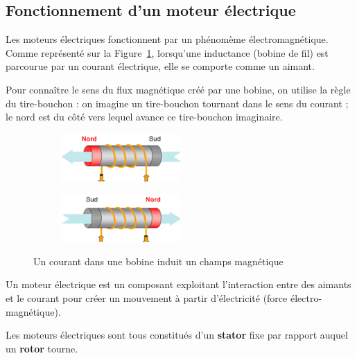 \documentclass[10pt,fleqn]{article} %
\begin{document}
\subsection{Fonctionnement d'un moteur électrique}
Les moteurs électriques fonctionnent par un phénomème électromagnétique. Comme représenté sur la Figure~\ref{fig:induction}, lorsqu'une inductance (bobine de fil) est parcourue par un courant électrique, elle se comporte comme un aimant.

\begin{remark}
    Pour connaître le sens du flux magnétique créé par une bobine, on utilise la règle du tire-bouchon : on imagine un tire-bouchon tournant dans le sens du courant ; le nord est du côté vers lequel avance ce tire-bouchon imaginaire.
\end{remark}


\begin{figure}[h]
  \centering
  \begin{subfigure}{0.5\textwidth}
    \centering
    \includegraphics[width=0.5\textwidth]{images/indu_aimant1}
  \end{subfigure}\hfill
  \begin{subfigure}{.5\textwidth}
    \centering
    \includegraphics[width=0.5\textwidth]{images/indu_aimant2}
  \end{subfigure}
  \caption{Un courant dans une bobine induit un champs magnétique}
  \label{fig:induction}
\end{figure}
Un moteur électrique est un composant exploitant l'interaction entre des aimants et le courant pour créer un mouvement à partir d'électricité (force électro-magnétique).

\begin{aretenir}
  Les moteurs électriques sont tous constitués d'un \textbf{stator} fixe par rapport auquel un \textbf{rotor} tourne.
\end{aretenir}
\end{document}
